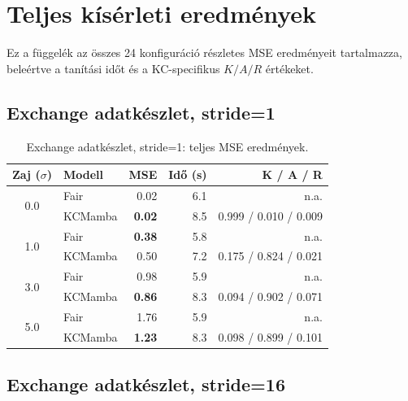 \chapter{Teljes kísérleti eredmények}
\label{app:full_results}

Ez a függelék az összes 24 konfiguráció részletes MSE eredményeit tartalmazza,
beleértve a tanítási időt és a KC-specifikus $K/A/R$ értékeket.

\section{Exchange adatkészlet, stride=1}

\begin{table}[H]
    \centering
    \small
    \begin{tabular}{|c|l|r|r|r|}
        \hline
        \textbf{Zaj ($\sigma$)} & \textbf{Modell} & \textbf{MSE} & \textbf{Idő (s)} & \textbf{K / A / R} \\
        \hline\hline
        \multirow{2}{*}{0.0}
            & Fair      & 0.02 & 6.1 & n.a. \\
            & KCMamba & \textbf{0.02} & 8.5 & 0.999 / 0.010 / 0.009 \\
        \hline
        \multirow{2}{*}{1.0}
            & Fair      & \textbf{0.38} & 5.8 & n.a. \\
            & KCMamba & 0.50 & 7.2 & 0.175 / 0.824 / 0.021 \\
        \hline
        \multirow{2}{*}{3.0}
            & Fair      & 0.98 & 5.9 & n.a. \\
            & KCMamba & \textbf{0.86} & 8.3 & 0.094 / 0.902 / 0.071 \\
        \hline
        \multirow{2}{*}{5.0}
            & Fair      & 1.76 & 5.9 & n.a. \\
            & KCMamba & \textbf{1.23} & 8.3 & 0.098 / 0.899 / 0.101 \\
        \hline
    \end{tabular}
    \caption{Exchange adatkészlet, stride=1: teljes MSE eredmények.}
    \label{tab:full_exchange_s1}
\end{table}

\section{Exchange adatkészlet, stride=16}

